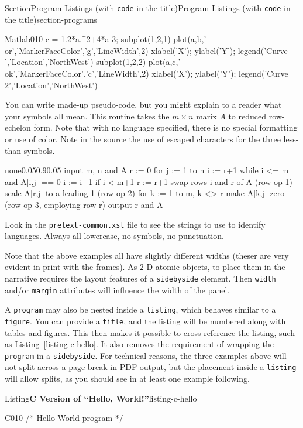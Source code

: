 \documentclass[twoside,10pt,]{article}
\newcommand{\xreffont}{\relax}
\newcommand{\mono}[1]{\texttt{#1}}
\numberwithin{equation}{section}
\begin{document}
\begin{sectionptx}{Section}{Program Listings (with \mono{code} in the title)}{}{Program Listings (with \mono{code} in the title)}{}{}{section-programs}
\begin{program}{Matlab}{0}{1}{0}
c = 1.2*a.^2+4*a-3;
subplot(1,2,1)
plot(a,b,'-or','MarkerFaceColor','g','LineWidth',2)
xlabel('X'); ylabel('Y'); legend('Curve ','Location','NorthWest')
subplot(1,2,2)
plot(a,c,'--ok','MarkerFaceColor','c','LineWidth',2)
xlabel('X'); ylabel('Y'); legend('Curve 2','Location','NorthWest')
\end{program}
You can write made-up pseudo-code, but you might explain to a reader what your symbols all mean.  This routine takes the \(m\times n\) marix \(A\) to reduced row-echelon form.  Note that with no language specified, there is no special formatting or use of color.  Note in the source the use of escaped characters for the three less-than symbols.%
\begin{program}{none}{0.05}{0.9}{0.05}
input m, n and A
r := 0
for j := 1 to n
   i := r+1
   while i <= m and A[i,j] == 0
       i := i+1
   if i < m+1
       r := r+1
       swap rows i and r of A (row op 1)
       scale A[r,j] to a leading 1 (row op 2)
       for k := 1 to m, k <> r
           make A[k,j] zero (row op 3, employing row r)
output r and A
\end{program}
Look in the \mono{pretext-common.xsl} file to see the strings to use to identify languages.  Always all-lowercase, no symbols, no punctuation.%
\par
Note that the above examples all have slightly different widths (theser are very evident in print with the frames).  As 2-D atomic objects, to place them in the narrative requires the layout features of a \mono{sidebyside} element.  Then \mono{width} and\slash{}or \mono{margin} attributes will influence the width of the panel.%
\par
A \mono{program} may also be nested inside a \mono{listing}, which behaves similar to a \mono{figure}.  You can provide a \mono{title}, and the listing will be numbered along with tables and figures.  This then makes it possible to cross-reference the listing, such as \hyperref[listing-c-hello]{Listing~{\xreffont\ref{listing-c-hello}}}.  It also removes the requirement of wrapping the \mono{program} in a \mono{sidebyside}.  For technical reasons, the three examples above will not split across a page break in PDF output, but the placement inside a \mono{listing} will allow splits, as you should see in at least one example following.%
\begin{listingptx}{Listing}{\textbf{C Version of ``Hello, World!''}}{listing-c-hello}{}%
\begin{program}{C}{0}{1}{0}
/* Hello World program */


\end{program}
\end{listingptx}
\end{sectionptx}
\end{document}

